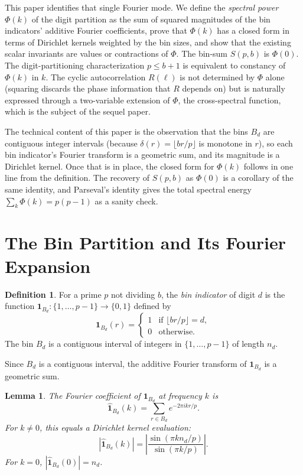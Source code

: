 \documentclass[12pt]{amsart}
\newtheorem{lemma}[theorem]{Lemma}
\theoremstyle{definition}
\newtheorem{definition}[theorem]{Definition}
\theoremstyle{remark}
\begin{document}
This paper identifies that single Fourier mode. We define
the \emph{spectral power} $\Phi(k)$ of the digit
partition as the sum of squared magnitudes of the bin
indicators' additive Fourier coefficients, prove that
$\Phi(k)$ has a closed form in terms of Dirichlet kernels
weighted by the bin sizes, and show that the existing
scalar invariants are values or contractions of $\Phi$.
The bin-sum $S(p,b)$ is $\Phi(0)$. The digit-partitioning
characterization $p \le b+1$ is equivalent to constancy of
$\Phi(k)$ in $k$. The cyclic autocorrelation $R(\ell)$ is
not determined by $\Phi$ alone (squaring discards the phase
information that $R$ depends on) but is naturally expressed
through a two-variable extension of $\Phi$, the
cross-spectral function, which is the subject of the
sequel paper.

The technical content of this paper is the observation
that the bins $B_d$ are contiguous integer intervals
(because $\delta(r) = \lfloor br/p \rfloor$ is monotone
in $r$), so each bin indicator's Fourier transform is a
geometric sum, and its magnitude is a Dirichlet kernel.
Once that is in place, the closed form for $\Phi(k)$
follows in one line from the definition. The recovery of
$S(p,b)$ as $\Phi(0)$ is a corollary of the same
identity, and Parseval's identity gives the total
spectral energy $\sum_k \Phi(k) = p(p-1)$ as a sanity
check.

\section{The Bin Partition and Its Fourier Expansion}

\begin{definition}
For a prime $p$ not dividing $b$, the \emph{bin indicator} of
digit $d$ is the function
$\mathbf{1}_{B_d} : \{1, \ldots, p{-}1\} \to \{0,1\}$ defined by
\[
\mathbf{1}_{B_d}(r) =
\begin{cases}
1 & \text{if } \lfloor br/p \rfloor = d, \\
0 & \text{otherwise}.
\end{cases}
\]
The bin $B_d$ is a contiguous interval of integers in
$\{1, \ldots, p{-}1\}$ of length $n_d$.
\end{definition}

Since $B_d$ is a contiguous interval, the additive Fourier
transform of $\mathbf{1}_{B_d}$ is a geometric sum.

\begin{lemma}\label{lem:fourier-bin}
The Fourier coefficient of $\mathbf{1}_{B_d}$ at frequency $k$ is
\[
\widehat{\mathbf{1}}_{B_d}(k)
= \sum_{r \in B_d} e^{-2\pi i k r / p}.
\]
For $k \ne 0$, this equals a Dirichlet kernel evaluation:
\[
|\widehat{\mathbf{1}}_{B_d}(k)|
= \left|\frac{\sin(\pi k n_d / p)}{\sin(\pi k / p)}\right|.
\]
For $k = 0$, $|\widehat{\mathbf{1}}_{B_d}(0)| = n_d$.
\end{lemma}
\end{document}
